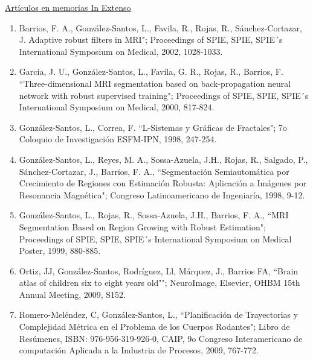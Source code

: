 \underline{\large Artículos en memorias In Extenso}

\begin{enumerate}[itemsep=-1mm]
\item Barrios, F. A., González-Santos, L., Favila, R., Rojas, R., Sánchez-Cortazar, J. Adaptive robust filters in MRI"; Proceedings of SPIE, SPIE, SPIE´s International Symposium on Medical, 2002, 1028-1033.
\item Garcia, J. U., González-Santos, L., Favila, G. R., Rojas, R., Barrios, F. “Three-dimensional MRI segmentation based on back-propagation neural network with robust supervised training"; Proceedings of SPIE, SPIE, SPIE´s International Symposium on Medical, 2000, 817-824.
\item González-Santos, L., Correa, F. “L-Sistemas y Gráficas de Fractales"; 7o Coloquio de Investigación ESFM-IPN, 1998, 247-254.
\item González-Santos, L., Reyes, M. A., Sossa-Azuela, J.H., Rojas, R., Salgado, P., Sánchez-Cortazar, J., Barrios, F. A., “Segmentación Semiautomática por Crecimiento de Regiones con Estimación Robusta: Aplicación a Imágenes por Resonancia Magnética"; Congreso Latinoamericano de Ingeniaría, 1998, 9-12.
\item González-Santos, L., Rojas, R., Sossa-Azuela, J.H., Barrios, F. A., “MRI Segmentation Based on Region Growing with Robust Estimation"; Proceedings of SPIE, SPIE, SPIE´s International Symposium on Medical Poster, 1999, 880-885.
\item Ortiz, JJ, González-Santos, Rodríguez, Ll, Márquez, J., Barrios FA, “Brain atlas of children six to eight years old""; NeuroImage, Elsevier, OHBM 15th Annual Meeting, 2009, S152.
\item Romero-Meléndez, C, González-Santos, L., “Planificación de Trayectorias y Complejidad Métrica en el Problema de los Cuerpos Rodantes"; Libro de Resúmenes, ISBN: 976-956-319-926-0, CAIP, 9o Congreso Interamericano de computación Aplicada a la Industria de Procesos, 2009, 767-772.
\end{enumerate}
